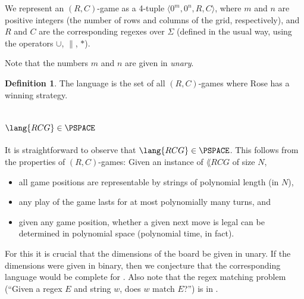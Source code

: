 \documentclass{article}
\newcommand{\0}{\mathbf{0}}
\newcommand{\1}{\mathbf{1}}
\newcommand{\2}{\mathbf{2}}
\newcommand{\RCG}{\lang{RCG}}
\newcommand{\set}[1]{{\left\{{#1}\right\}}}
\newcommand{\tup}[1]{\langle{} #1 \rangle{}}
\theoremstyle{plain}
\theoremstyle{definition}
\newtheorem{definition}{Definition}
\newcounter{row}
\newcounter{col}
\begin{document}


We represent an $(R,C)$-game as a 4-tuple $\tup{0^m,0^n,R,C}$, where $m$ and $n$ are positive integers (the number of rows and columns of the grid, respectively), and $R$ and $C$ are the corresponding regexes over $\Sigma$ (defined in the usual way, using the operators $\cup$, $\|$, $*$).

Note that the numbers $m$ and $n$ are given in \emph{unary}.

\begin{definition}
  The language \emph{\RCG} is the set of all $(R,C)$-games where Rose has
  a winning strategy.
\end{definition}

\section{\texorpdfstring{$\RCG \in \PSPACE$}{RCG in PSPACE}}

It is straightforward to observe that $\RCG \in \PSPACE$.  This follows from the properties of $(R,C)$-games: Given an instance of $\RCG$ of size $N$,
\begin{itemize}
\item
all game positions are representable by strings of polynomial length (in $N$),
\item
any play of the game lasts for at most polynomially many turns, and
\item
given any game position, whether a given next move is legal can be determined in polynomial space (polynomial time, in fact).
\end{itemize}
For this it is crucial that the dimensions of the board be given in unary.  If the dimensions were given in binary, then we conjecture that the corresponding language would be complete for .  Also note that the regex matching problem (``Given a regex $E$ and string $w$, does $w$ match $E$?'') is in .
\end{document}
